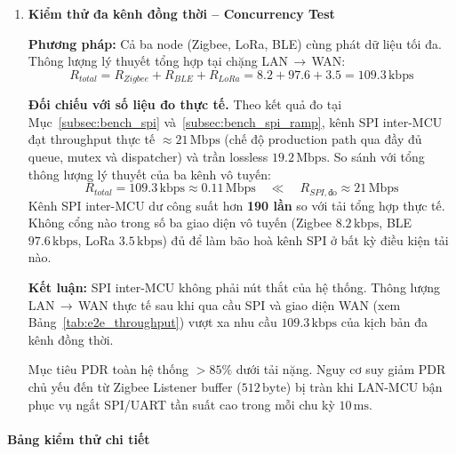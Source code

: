 \begin{enumerate}
            \item \textbf{Kiểm thử đa kênh đồng thời -- Concurrency Test}
            
            \textbf{Phương pháp:} Cả ba node (Zigbee, LoRa, BLE) cùng phát dữ liệu tối đa. Thông lượng lý thuyết tổng hợp tại chặng LAN$\,\rightarrow\,$WAN:
            \[
                R_{total} = R_{Zigbee} + R_{BLE} + R_{LoRa}
                            = 8{.}2 + 97{.}6 + 3{.}5
                            = 109{.}3\,\text{kbps}
            \]
            
            \textbf{Đối chiếu với số liệu đo thực tế.} Theo kết quả đo tại Mục~\ref{subsec:bench_spi} và~\ref{subsec:bench_spi_ramp}, kênh SPI inter-MCU đạt throughput thực tế $\approx 21\,\text{Mbps}$ (chế độ production path qua đầy đủ queue, mutex và dispatcher) và trần lossless $19{.}2\,\text{Mbps}$. So sánh với tổng thông lượng lý thuyết của ba kênh vô tuyến:
            \[
                R_{total} = 109{.}3\,\text{kbps} \approx 0{.}11\,\text{Mbps}
                \quad \ll \quad
                R_{SPI,\text{đo}} \approx 21\,\text{Mbps}
            \]
            Kênh SPI inter-MCU dư công suất hơn \textbf{190 lần} so với tải tổng hợp thực tế. Không cổng nào trong số ba giao diện vô tuyến (Zigbee $8{.}2\,\text{kbps}$, BLE $97{.}6\,\text{kbps}$, LoRa $3{.}5\,\text{kbps}$) đủ để làm bão hoà kênh SPI ở bất kỳ điều kiện tải nào.

            \textbf{Kết luận:} SPI inter-MCU không phải nút thắt của hệ thống. Thông lượng LAN$\,\rightarrow\,$WAN thực tế sau khi qua cầu SPI và giao diện WAN (xem Bảng~\ref{tab:e2e_throughput}) vượt xa nhu cầu $109{.}3\,\text{kbps}$ của kịch bản đa kênh đồng thời.
            
            Mục tiêu PDR toàn hệ thống $> 85\%$ dưới tải nặng. Nguy cơ suy giảm PDR chủ yếu đến từ Zigbee Listener buffer ($512\,\text{byte}$) bị tràn khi LAN-MCU bận phục vụ ngắt SPI/UART tần suất cao trong mỗi chu kỳ $10\,\text{ms}$.
            
        \end{enumerate}

        \paragraph{Bảng kiểm thử chi tiết}

